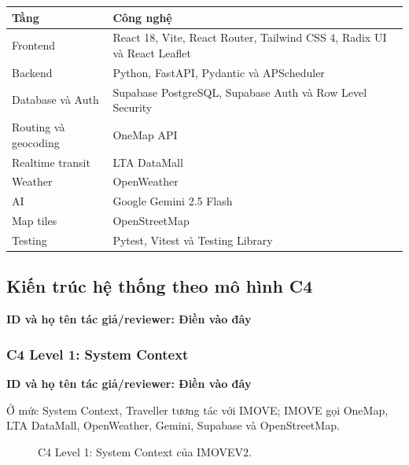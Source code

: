 \documentclass[12pt,a4paper]{article}
\newcommand{\tacgia}{%
  \begin{tcolorbox}[colback=blue!3,colframe=blue!25,boxrule=0.4pt,arc=1mm]
    \small\textbf{ID và họ tên tác giả/reviewer: Điền vào đây}
  \end{tcolorbox}
}
\begin{document}
\begin{longtable}{|L{3.6cm}|L{11.0cm}|}
\hline
\textbf{Tầng} & \textbf{Công nghệ} \\ \hline
\endhead
Frontend & React 18, Vite, React Router, Tailwind CSS 4, Radix UI và React Leaflet \\ \hline
Backend & Python, FastAPI, Pydantic và APScheduler \\ \hline
Database và Auth & Supabase PostgreSQL, Supabase Auth và Row Level Security \\ \hline
Routing và geocoding & OneMap API \\ \hline
Realtime transit & LTA DataMall \\ \hline
Weather & OpenWeather \\ \hline
AI & Google Gemini 2.5 Flash \\ \hline
Map tiles & OpenStreetMap \\ \hline
Testing & Pytest, Vitest và Testing Library \\ \hline
\end{longtable}

\subsection{Kiến trúc hệ thống theo mô hình C4}
\tacgia

\subsubsection{C4 Level 1: System Context}
\tacgia
Ở mức System Context, Traveller tương tác với IMOVE; IMOVE gọi OneMap, LTA DataMall, OpenWeather, Gemini, Supabase và OpenStreetMap.

\begin{figure}[H]
\centering
{}
\caption{C4 Level 1: System Context của IMOVEV2.}
\label{fig:c4-context}
\end{figure}
\end{document}
